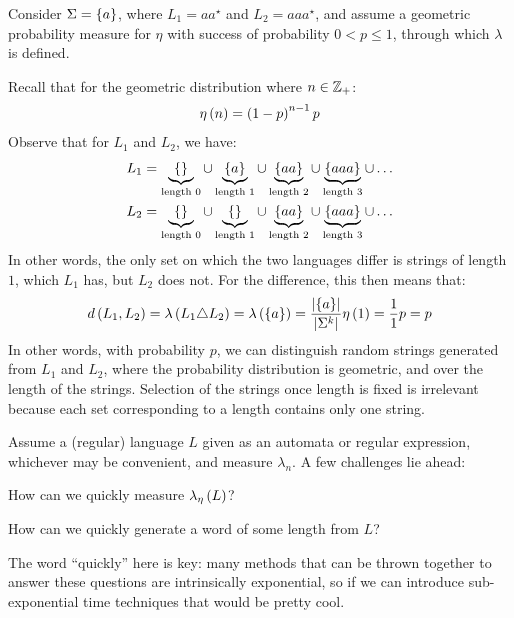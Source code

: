 \begin{example}
  Consider \(\Sigma = \left\{a\right\}\),
  where \(L_1 = aa^\star\) and \(L_2 = aaa^\star\),
  and assume a geometric probability measure for \(\eta\)
  with success of probability \(0 < p \leq 1\),
  through which \(\lambda\) is defined.

  Recall that for the geometric distribution where \(n \in \mathbb{Z}_{+}\):
  \begin{align*}
    \eta\left(n\right) = \left(1 - p\right)^{n - 1} p
  \end{align*}
  Observe that for \(L_1\) and \(L_2\), we have:
  \begin{align*}
    L_1 &=
      \underbrace{\left\{\right\}}_{\text{length \(0\)}} \cup
      \underbrace{\left\{a\right\}}_{\text{length \(1\)}} \cup
      \underbrace{\left\{aa\right\}}_{\text{length \(2\)}} \cup
      \underbrace{\left\{aaa\right\}}_{\text{length \(3\)}} \cup
      \ldots \\
    L_2 &= 
      \underbrace{\left\{\right\}}_{\text{length \(0\)}} \cup
      \underbrace{\left\{\right\}}_{\text{length \(1\)}} \cup
      \underbrace{\left\{aa\right\}}_{\text{length \(2\)}} \cup
      \underbrace{\left\{aaa\right\}}_{\text{length \(3\)}} \cup
      \ldots
  \end{align*}
  In other words, the only set on which the two languages differ is
  strings of length \(1\), which \(L_1\) has, but \(L_2\) does not.
  For the difference, this then means that:
  \begin{align*}
    d\left(L_1, L_2\right)
      = \lambda\left(L_1 \triangle L_2\right)
      = \lambda\left(\left\{a\right\}\right)
      = \frac{\left\lvert\left\{a\right\}\right\rvert}{\left\lvert\Sigma^k\right\rvert} \eta \left(1\right)
      = \frac{1}{1} p = p
  \end{align*}
  In other words, with probability \(p\),
  we can distinguish random strings generated from \(L_1\) and \(L_2\),
  where the probability distribution is geometric,
  and over the length of the strings.
  Selection of the strings once length is fixed is irrelevant because
  each set corresponding to a length contains only one string.
\end{example}

Assume a (regular) language \(L\) given as an automata or regular
expression, whichever may be convenient, and measure \(\lambda_{n}\).
A few challenges lie ahead:

\begin{question}
  How can we quickly measure \(\lambda_{\eta}\left(L\right)\)?
\end{question}

\begin{question}
  How can we quickly generate a word of some length from \(L\)?
\end{question}

The word ``quickly'' here is key:
many methods that can be thrown together to answer these questions
are intrinsically exponential,
so if we can introduce sub-exponential time techniques
that would be pretty cool.



